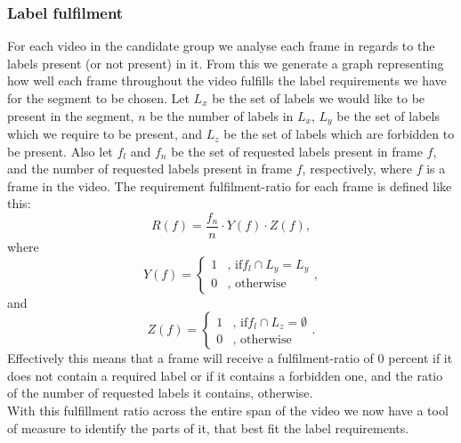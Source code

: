 \subsubsection{Label fulfilment}
%
For each video in the candidate group we analyse each frame in regards to the labels present (or not present) in it. From this we generate a graph representing how well each frame throughout the video fulfills the label requirements we have for the segment to be chosen. Let $L_{x}$ be the set of labels we would like to be present in the segment, $n$ be the number of labels in $L_{x}$, $L_{y}$ be the set of labels which we require to be present, and $L_{z}$ be the set of labels which are forbidden to be present. Also let $f_{l}$ and $f_{n}$ be the set of requested labels present in frame $f$, and the number of requested labels present in frame $f$, respectively, where $f$ is a frame in the video. The requirement fulfilment-ratio for each frame is defined like this:\\
%
\begin{equation}
R(f) = \frac{f_{n}}{n} \cdot Y(f) \cdot Z(f),
\end{equation} 
%
where
%
\begin{equation}
Y(f) =
\begin{cases}
1 & \text{, if} f_{l} \cap L_{y} = L_{y}\\
0 &  \text{, otherwise}
\end{cases},
\end{equation} 
%
and
%
\begin{equation}
Z(f) =
\begin{cases}
1 & \text{, if} f_{l} \cap L_{z} = \emptyset\\
0 &  \text{, otherwise}
\end{cases}.
\end{equation} 
%
Effectively this means that a frame will receive a fulfilment-ratio of 0 percent if it does not contain a required label or if it contains a forbidden one, and the ratio of the number of requested labels it contains, otherwise.\\
%
With this fulfillment ratio across the entire span of the video we now have a tool of measure to identify the parts of it, that best fit the label requirements.
%
